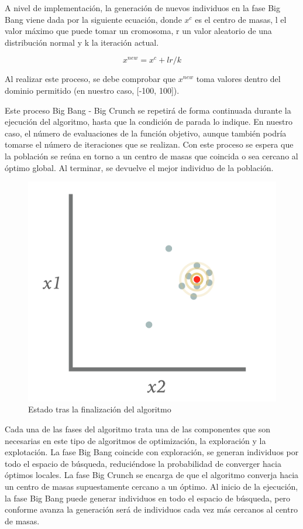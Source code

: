 A nivel de implementación, la generación de nuevos individuos en la fase Big Bang viene dada por la siguiente ecuación, donde $x^c$ es el centro de masas, l el valor máximo que puede tomar un cromosoma, r un valor aleatorio de una distribución normal y k la iteración actual.

\begin{equation}
    \label{eqn:desv}
    x^{new} = x^c + lr/k
\end{equation}

Al realizar este proceso, se debe comprobar que \noindent $x^{new}$ toma valores dentro del dominio permitido (en nuestro caso, [-100, 100]). 

Este proceso Big Bang - Big Crunch se repetirá de forma continuada durante la ejecución del algoritmo, hasta que la condición de parada lo indique. En nuestro caso, el número de evaluaciones de la función objetivo, aunque también podría tomarse el número de iteraciones que se realizan. Con este proceso se espera que la población se reúna en torno a un centro de masas que coincida o sea cercano al óptimo global. Al terminar, se devuelve el mejor individuo de la población. 

\begin{figure}[H]
\centering
    \includegraphics[scale=0.23]{img/end.png}
    \caption{Estado tras la finalización del algoritmo}
\end{figure}

Cada una de las fases del algoritmo trata una de las componentes que son necesarias en este tipo de algoritmos de optimización, la exploración y la explotación. La fase Big Bang coincide con exploración, se generan individuos por todo el espacio de búsqueda, reduciéndose la probabilidad de converger hacia óptimos locales. La fase Big Crunch se encarga de que el algoritmo converja hacia un centro de masas supuestamente cercano a un óptimo. Al inicio de la ejecución, la fase Big Bang puede generar individuos en todo el espacio de búsqueda, pero conforme avanza la generación será de individuos cada vez más cercanos al centro de masas. 

